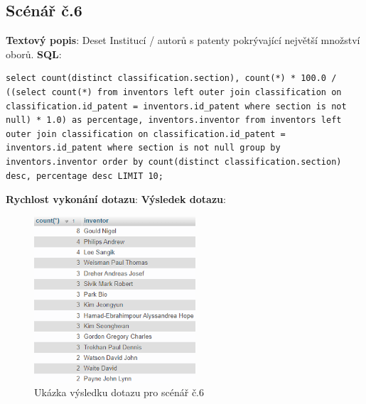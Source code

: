 \subsection{Scénář č.6}
\textbf{Textový popis}: Deset Institucí / autorů s patenty pokrývající největší množství oborů.
\newline
\textbf{SQL}: 
\begin{lstlisting}[label = {lst:elements_a}]
select count(distinct classification.section), count(*) * 100.0 / ((select count(*) from inventors left outer join classification on classification.id_patent = inventors.id_patent where section is not null) * 1.0) as percentage, inventors.inventor from inventors left outer join classification on classification.id_patent = inventors.id_patent where section is not null group by inventors.inventor order by count(distinct classification.section) desc, percentage desc LIMIT 10;
\end{lstlisting}
\textbf{Rychlost vykonání dotazu}: 
\newline
\textbf{Výsledek dotazu}:
\begin{figure}[H]
\centering
\includegraphics[width=6cm]{img/scenare/scenar_9}
\caption{Ukázka výsledku dotazu pro scénář č.6}
\label{fig:scenar6}
\end{figure}

